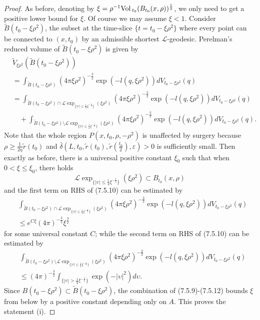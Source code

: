 \begin{proof}
As before, denoting by
$\xi=\rho^{-1}{\rm Vol}\,_{t_0}(B_{t_0}(x,\rho))^{\frac{1}{3}}$, we only
need to get a positive lower bound for $\xi$. Of course we may
assume $\xi<1$. Consider $\widetilde{B}(t_0-\xi\rho^2)$, the
subset at the time-slice $\{t=t_0-\xi\rho^2\}$ where every point
can be connected to $(x,t_0)$ by an admissible shortest
$\mathcal{L}$-geodesic. Perelman's reduced volume of
$\widetilde{B}(t_0-\xi\rho^2)$ is given by
\begin{align}
& \widetilde{V}_{\xi\rho^2}(\widetilde{B}(t_0-\xi\rho^2))\\
&  = \int_{\widetilde{B}(t_0-\xi\rho^2)}
(4\pi\xi\rho^2)^{-\frac{3}{2}}
\exp(-l(q,\xi\rho^2))dV_{t_0-\xi\rho^2}(q) \nonumber\\
& =\int_{\widetilde{B}(t_0-\xi\rho^2)\cap\mathcal{L}
\exp_{\{|\upsilon|\leq\frac{1}{4}
\xi^{-\frac{1}{2}}\}}(\xi\rho^2)} (4\pi\xi\rho^2)^{-\frac{3}{2}}
\exp(-l(q,\xi\rho^2))dV_{t_0-\xi\rho^2}(q) \nonumber\\
&\quad  +\int_{\widetilde{B}(t_0-\xi\rho^2)
\setminus\mathcal{L}\exp_{\{|\upsilon|\leq\frac{1}{4}
\xi^{-\frac{1}{2}}\}}(\xi\rho^2)} (4\pi\xi\rho^2)^{-\frac{3}{2}}
\exp(-l(q,\xi\rho^2))dV_{t_0-\xi\rho^2}(q). \nonumber
\end{align}  %
Note that the whole region $P(x,t_0,\rho,-\rho^2)$ is unaffected
by surgery because $\rho\geq \frac{1}{2\eta}\widetilde{r}(t_0)$
and $\bar{\delta}(L,t_0,\widetilde{r}(t_0),
\widetilde{r}(\frac{t_0}{2}),\varepsilon)>0$ is sufficiently
small. Then exactly as before, there is a universal positive
constant $\xi_0$ such that when $0<\xi\leq\xi_0$, there holds
$$
\mathcal{L}\exp_{\{|\upsilon|\leq\frac{1}{4}
\xi^{-\frac{1}{2}}\}}(\xi\rho^2)\subset B_{t_0}(x,\rho)
$$
and the first term on RHS of (7.5.10) can be estimated by
\begin{align}
&\int_{\widetilde{B}(t_0-\xi\rho^2)\cap\mathcal{L}
\exp_{\{|\upsilon|\leq\frac{1}{4}\xi^{-\frac{1}{2}}\}}
(\xi\rho^2)}(4\pi\xi\rho^2)^{-\frac{3}{2}}
\exp(-l(q,\xi\rho^2))dV_{t_0-\xi\rho^2}(q)\\
&\leq e^{C\xi}(4\pi)^{-\frac{3}{2}}\xi^{\frac{3}{2}}\nonumber  %
\end{align}
for some universal constant $C$; while the second term on RHS of
(7.5.10) can be estimated by
\begin{align}
&\int_{\widetilde{B}(t_0-\xi\rho^2)\setminus\mathcal{L}
\exp_{\{|\upsilon|\leq\frac{1}{4}\xi^{-\frac{1}{2}}\}}
(\xi\rho^2)}(4\pi\xi\rho^2)^{-\frac{3}{2}}
\exp(-l(q,\xi\rho^2))dV_{t_0-\xi\rho^2}(q)\\
&\leq(4\pi)^{-\frac{3}{2}}\int_{\{|\upsilon|>\frac{1}{4}
\xi^{-\frac{1}{2}}\}}\exp(-|\upsilon|^2)d\upsilon. \nonumber
\end{align}
Since $B(t_0-\xi\rho^2)\subset\widetilde{B}(t_0-\xi\rho^2)$, the
combination of (7.5.9)-(7.5.12) bounds $\xi$ from below by a
positive constant depending only on $A$. This proves the statement
(i).


\end{proof}
